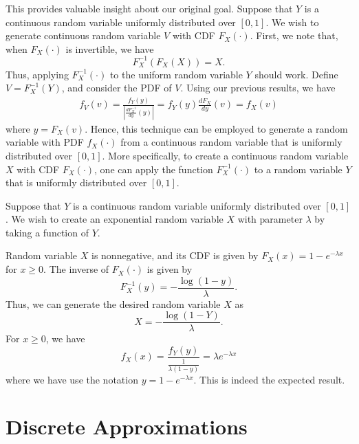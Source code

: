 This provides valuable insight about our original goal.
Suppose that $Y$ is a continuous random variable uniformly distributed over $[0,1]$.
We wish to generate continuous random variable $V$ with CDF $F_X(\cdot)$.
First, we note that, when $F_X (\cdot)$ is invertible, we have
\begin{equation*}
F_X^{-1} \left( F_X (X) \right) = X .
\end{equation*}
Thus, applying $F_X^{-1} (\cdot)$ to the uniform random variable $Y$ should work.
Define $V = F_X^{-1} (Y)$, and consider the PDF of $V$.
Using our previous results, we have
\begin{equation*}
\begin{split}
f_V (v) = \frac{ f_Y (y) }{ \left| \frac{d F_X^{-1}}{dy} (y) \right| }
= f_Y (y) \frac{d F_X}{dy} (v) = f_X (v)
\end{split}
\end{equation*}
where $y = F_X (v)$.
Hence, this technique can be employed to generate a random variable with PDF $f_X (\cdot)$ from a continuous random variable that is uniformly distributed over $[0,1]$.
More specifically, to create a continuous random variable $X$ with CDF $F_X (\cdot)$, one can apply the function $F_X^{-1} (\cdot)$ to a random variable $Y$ that is uniformly distributed over $[0,1]$.

\begin{example}
Suppose that $Y$ is a continuous random variable uniformly distributed over $[0,1]$.
We wish to create an exponential random variable $X$ with parameter $\lambda$ by taking a function of $Y$.

Random variable $X$ is nonnegative, and its CDF is given by $F_X(x) = 1 - e^{- \lambda x}$ for $x \geq 0$.
The inverse of $F_X (\cdot)$ is given by
\begin{equation*}
F_X^{-1} (y) = - \frac{ \log (1 - y) }{\lambda} .
\end{equation*}
Thus, we can generate the desired random variable $X$ as
\begin{equation*}
X = - \frac{ \log (1 - Y) }{\lambda} .
\end{equation*}
For $x \geq 0$, we have
\begin{equation*}
f_X (x) = \frac{ f_Y (y) }{ \frac{1}{\lambda (1 - y)} }
= \lambda e^{- \lambda x}
\end{equation*}
where we have use the notation $y = 1 - e^{- \lambda x}$.
This is indeed the expected result.
\end{example}


\section{Discrete Approximations}

